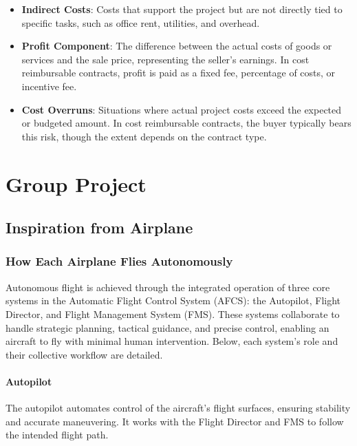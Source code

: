 \documentclass[math,code]{amznotes}
\theoremstyle{remark}
\begin{document}
\begin{enumerate}
\begin{itemize}
        \item \textbf{Indirect Costs}: Costs that support the project but are not directly tied to specific tasks, such as office rent, utilities, and overhead.
        
        \item \textbf{Profit Component}: The difference between the actual costs of goods or services and the sale price, representing the seller’s earnings. In cost reimbursable contracts, profit is paid as a fixed fee, percentage of costs, or incentive fee.
        
        \item \textbf{Cost Overruns}: Situations where actual project costs exceed the expected or budgeted amount. In cost reimbursable contracts, the buyer typically bears this risk, though the extent depends on the contract type.
    \end{itemize}
\end{enumerate}

\chapter{Group Project}
\section{Inspiration from Airplane}
\subsection{How Each Airplane Flies Autonomously}
Autonomous flight is achieved through the integrated operation of three core systems in the Automatic Flight Control System (AFCS): the Autopilot, Flight Director, and Flight Management System (FMS). These systems collaborate to handle strategic planning, tactical guidance, and precise control, enabling an aircraft to fly with minimal human intervention. Below, each system’s role and their collective workflow are detailed.

\subsubsection{Autopilot}
The autopilot automates control of the aircraft’s flight surfaces, ensuring stability and accurate maneuvering. It works with the Flight Director and FMS to follow the intended flight path.
\end{document}
